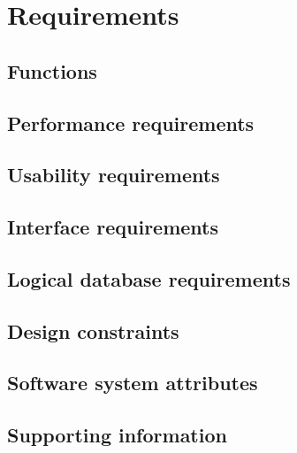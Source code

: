\section{Requirements}

\subsection{Functions}

\subsection{Performance requirements}

\subsection{Usability requirements}

\subsection{Interface requirements}

\subsection{Logical database requirements}

\subsection{Design constraints}

\subsection{Software system attributes}

\subsection{Supporting information}